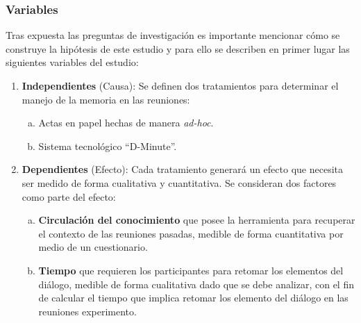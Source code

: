 \subsubsection{Variables}

Tras expuesta las preguntas de investigación es importante mencionar cómo se construye la hipótesis de este estudio y para ello se describen en primer lugar  las siguientes variables del estudio: 

\begin{enumerate}[1.]
    \item \textbf{Independientes} (Causa): Se definen dos tratamientos para determinar el manejo de la memoria en las reuniones: 
    \begin{enumerate}[a.]
	    \item Actas en papel hechas de manera \textit{ad-hoc}. 
		\item Sistema tecnológico “D-Minute”.
    \end{enumerate}

    \item \textbf{Dependientes} (Efecto): Cada tratamiento generará un efecto que necesita ser medido de forma cualitativa y cuantitativa. Se consideran dos factores como parte del efecto:
    \begin{enumerate}[a.]
	    \item \textbf{Circulación del conocimiento} que posee la herramienta para recuperar el contexto de las reuniones pasadas, medible de forma cuantitativa por medio de un cuestionario.
	    \item \textbf{Tiempo} que requieren los participantes para retomar los elementos del diálogo, medible de forma cualitativa dado que se debe analizar, con el fin de calcular el tiempo que implica retomar los elemento del diálogo en las reuniones experimento.
    \end{enumerate}


\end{enumerate}

